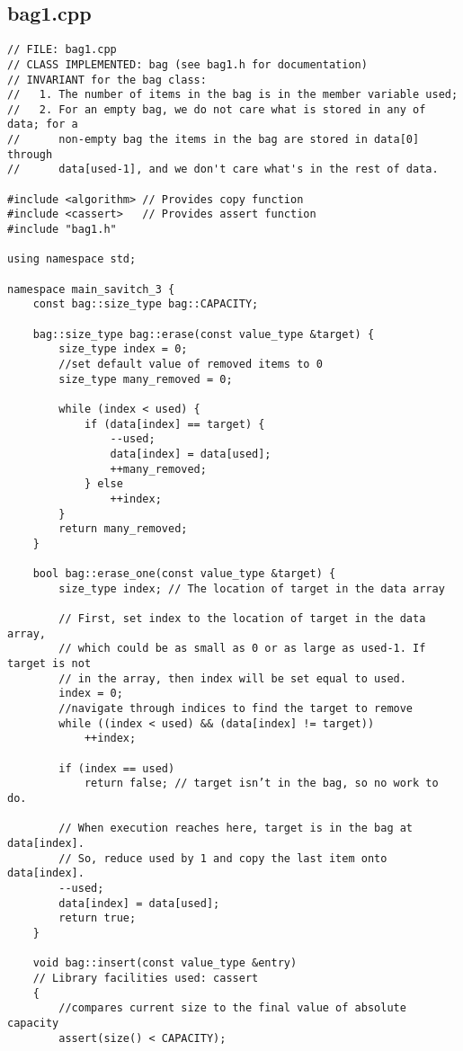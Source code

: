 \documentclass[11pt]{article}
\begin{document}
\subsection*{bag1.cpp}
\begin{lstlisting}
// FILE: bag1.cpp
// CLASS IMPLEMENTED: bag (see bag1.h for documentation)
// INVARIANT for the bag class:
//   1. The number of items in the bag is in the member variable used;
//   2. For an empty bag, we do not care what is stored in any of data; for a
//      non-empty bag the items in the bag are stored in data[0] through
//      data[used-1], and we don't care what's in the rest of data.

#include <algorithm> // Provides copy function
#include <cassert>   // Provides assert function
#include "bag1.h"

using namespace std;

namespace main_savitch_3 {
    const bag::size_type bag::CAPACITY;

    bag::size_type bag::erase(const value_type &target) {
        size_type index = 0;
        //set default value of removed items to 0
        size_type many_removed = 0;

        while (index < used) {
            if (data[index] == target) {
                --used;
                data[index] = data[used];
                ++many_removed;
            } else
                ++index;
        }
        return many_removed;
    }

    bool bag::erase_one(const value_type &target) {
        size_type index; // The location of target in the data array

        // First, set index to the location of target in the data array,
        // which could be as small as 0 or as large as used-1. If target is not
        // in the array, then index will be set equal to used.
        index = 0;
        //navigate through indices to find the target to remove
        while ((index < used) && (data[index] != target))
            ++index;

        if (index == used)
            return false; // target isn’t in the bag, so no work to do.

        // When execution reaches here, target is in the bag at data[index].
        // So, reduce used by 1 and copy the last item onto data[index].
        --used;
        data[index] = data[used];
        return true;
    }

    void bag::insert(const value_type &entry)
    // Library facilities used: cassert
    {
        //compares current size to the final value of absolute capacity
        assert(size() < CAPACITY);


\end{lstlisting}
\end{document}
